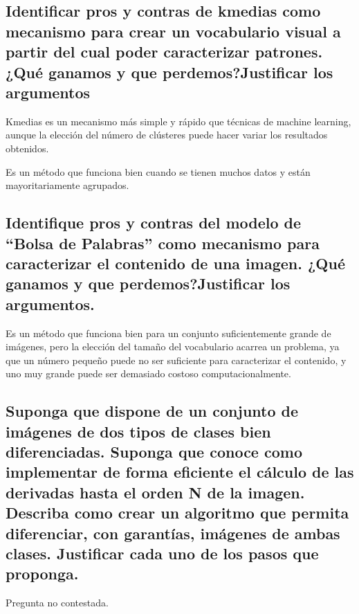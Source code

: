\documentclass[11pt]{scrartcl} %
\begin{document}
\newpage

\subsection{Identificar pros y contras de kmedias como mecanismo para crear un
vocabulario visual a partir del cual poder caracterizar patrones.\newline
¿Qué ganamos y que perdemos?\newline Justificar los argumentos}

Kmedias es un mecanismo más simple y rápido que técnicas de machine learning,
aunque la elección del número de clústeres puede hacer variar los resultados obtenidos.\newline

Es un método que funciona bien cuando se tienen muchos datos y están mayoritariamente
agrupados.


\subsection{Identifique pros y contras del modelo de “Bolsa de Palabras” como
mecanismo para caracterizar el contenido de una imagen. ¿Qué ganamos y que
perdemos?\newline Justificar los argumentos.}

Es un método que funciona bien para un conjunto suficientemente grande de imágenes,
pero la elección del tamaño del vocabulario acarrea un problema, ya que un número 
pequeño puede no ser suficiente para caracterizar el contenido, y uno muy grande
puede ser demasiado costoso computacionalmente.

\subsection{Suponga que dispone de un conjunto de imágenes de dos tipos de
clases bien diferenciadas. Suponga que conoce como implementar de forma
eficiente el cálculo de las derivadas hasta el orden N de la imagen. Describa
como crear un algoritmo que permita diferenciar, con garantías, imágenes de
ambas clases. Justificar cada uno de los pasos que proponga.}

Pregunta no contestada.
\end{document}
